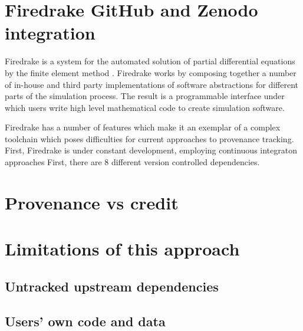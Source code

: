 \documentclass[a4paper,11pt]{article}
\begin{document}
\section{Firedrake GitHub and Zenodo integration}

Firedrake is a system for the automated solution of partial differential
equations by the finite element method \parencite{Rathgeber2016}. Firedrake
works by composing together a number of in-house and third party
implementations of software abstractions for different parts of the
simulation process. The result is a programmable interface under which users
write high level mathematical code to create simulation software.

Firedrake has a number of features which make it an exemplar of a complex
toolchain which poses difficulties for current approaches to provenance
tracking. First, Firedrake is under constant development, employing
continuous integraton approaches First, there are 8 different version controlled dependencies. 

\section{Provenance vs credit}

\section{Limitations of this approach}

\subsection{Untracked upstream dependencies}

\subsection{Users' own code and data}
\end{document}

